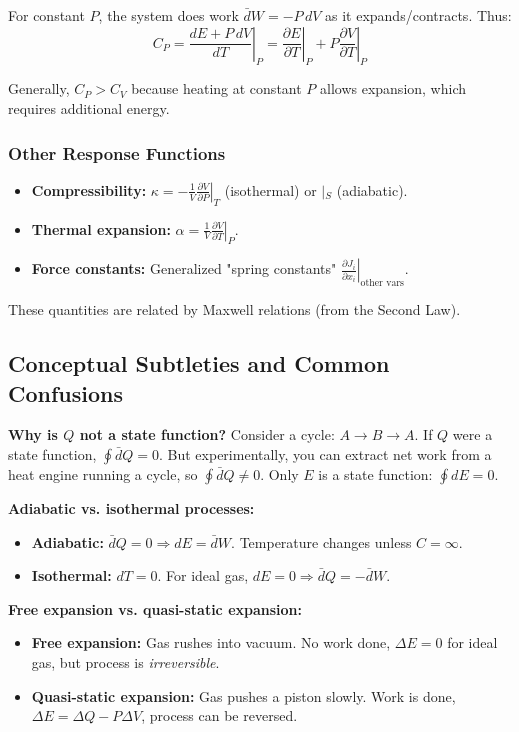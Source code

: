 \documentclass[9pt,twocoloumn]{article}
\begin{document}
For constant $P$, the system does work $\bar{d}W = -P \, dV$ as it expands/contracts. Thus:
\begin{equation}
C_P = \left. \frac{dE + P \, dV}{dT} \right|_P = \left. \frac{\partial E}{\partial T} \right|_P + P \left. \frac{\partial V}{\partial T} \right|_P
\end{equation}

Generally, $C_P > C_V$ because heating at constant $P$ allows expansion, which requires additional energy.

\subsubsection{Other Response Functions}
\begin{itemize}
    \item \textbf{Compressibility:} $\kappa = -\frac{1}{V} \left. \frac{\partial V}{\partial P} \right|_T$ (isothermal) or $\left|_S\right.$ (adiabatic).
    \item \textbf{Thermal expansion:} $\alpha = \frac{1}{V} \left. \frac{\partial V}{\partial T} \right|_P$.
    \item \textbf{Force constants:} Generalized "spring constants" $\left. \frac{\partial J_i}{\partial x_i} \right|_{\text{other vars}}$.
\end{itemize}

These quantities are related by Maxwell relations (from the Second Law).

\subsection{Conceptual Subtleties and Common Confusions}

\textbf{Why is $Q$ not a state function?}
Consider a cycle: $A \to B \to A$. If $Q$ were a state function, $\oint \bar{d}Q = 0$. But experimentally, you can extract net work from a heat engine running a cycle, so $\oint \bar{d}Q \neq 0$. Only $E$ is a state function: $\oint dE = 0$.

\textbf{Adiabatic vs. isothermal processes:}
\begin{itemize}
    \item \textbf{Adiabatic:} $\bar{d}Q = 0 \Rightarrow dE = \bar{d}W$. Temperature changes unless $C = \infty$.
    \item \textbf{Isothermal:} $dT = 0$. For ideal gas, $dE = 0 \Rightarrow \bar{d}Q = -\bar{d}W$.
\end{itemize}

\textbf{Free expansion vs. quasi-static expansion:}
\begin{itemize}
    \item \textbf{Free expansion:} Gas rushes into vacuum. No work done, $\Delta E = 0$ for ideal gas, but process is \emph{irreversible}.
    \item \textbf{Quasi-static expansion:} Gas pushes a piston slowly. Work is done, $\Delta E = \Delta Q - P \Delta V$, process can be reversed.
\end{itemize}
\end{document}
